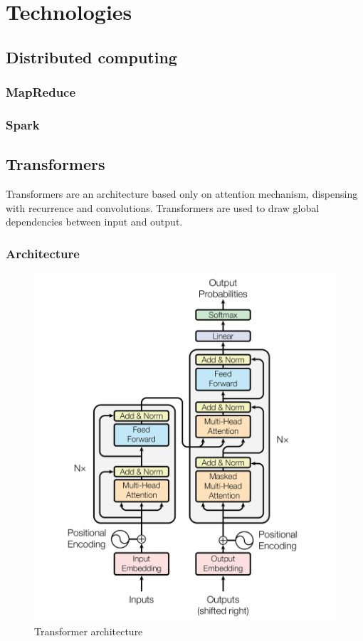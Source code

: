 \documentclass[\main/main.tex]{subfiles}
\begin{document}
\chapter{Technologies}
\section{Distributed computing}
\subsection{MapReduce}
\subsection{Spark}

\section{Transformers}
Transformers \allowbreak\cite{vaswani2017attention} are an architecture based only on attention mechanism, dispensing with recurrence and convolutions. Transformers are used to draw global dependencies between input and output.
\subsection{Architecture}
\begin{figure}[h]
    \centering
    \includegraphics[scale=0.35]{images/transformer/transformer_model_architecture.png}
    \caption{Transformer architecture}
    \label{fig:transformer_architecture}
\end{figure}
\end{document}
